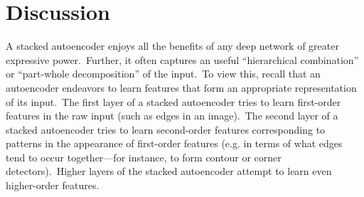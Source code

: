 \section{Discussion}
A stacked autoencoder enjoys all the benefits of any deep network of greater expressive power.~Further, it often captures an useful ``hierarchical combination'' or ``part-whole decomposition'' of the input.~To view this, recall that an autoencoder endeavors to learn features that form an appropriate representation of its input.~The first layer of a stacked autoencoder tries to learn first-order features in the raw input (such as edges in an image).~The second layer of a stacked autoencoder tries to learn second-order features corresponding to patterns in the appearance of first-order features (e.g. in terms of what edges tend to occur together---for instance, to form contour or corner detectors).~Higher layers of the stacked autoencoder attempt to learn even higher-order features.
